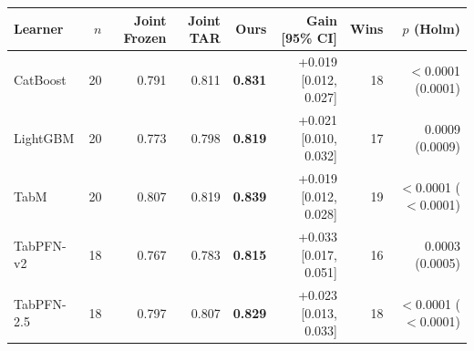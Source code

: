 \begin{tabular}{lrrrrrrr}
\toprule
Learner & $n$ & Joint Frozen & Joint TAR & Ours & Gain [95\% CI] & Wins & $p$ (Holm) \\
\midrule
CatBoost & 20 & 0.791 & 0.811 & \textbf{0.831} & +0.019 [0.012, 0.027] & 18 & $<$0.0001 (0.0001) \\
LightGBM & 20 & 0.773 & 0.798 & \textbf{0.819} & +0.021 [0.010, 0.032] & 17 & 0.0009 (0.0009) \\
TabM & 20 & 0.807 & 0.819 & \textbf{0.839} & +0.019 [0.012, 0.028] & 19 & $<$0.0001 ($<$0.0001) \\
TabPFN-v2 & 18 & 0.767 & 0.783 & \textbf{0.815} & +0.033 [0.017, 0.051] & 16 & 0.0003 (0.0005) \\
TabPFN-2.5 & 18 & 0.797 & 0.807 & \textbf{0.829} & +0.023 [0.013, 0.033] & 18 & $<$0.0001 ($<$0.0001) \\
\bottomrule
\end{tabular}
